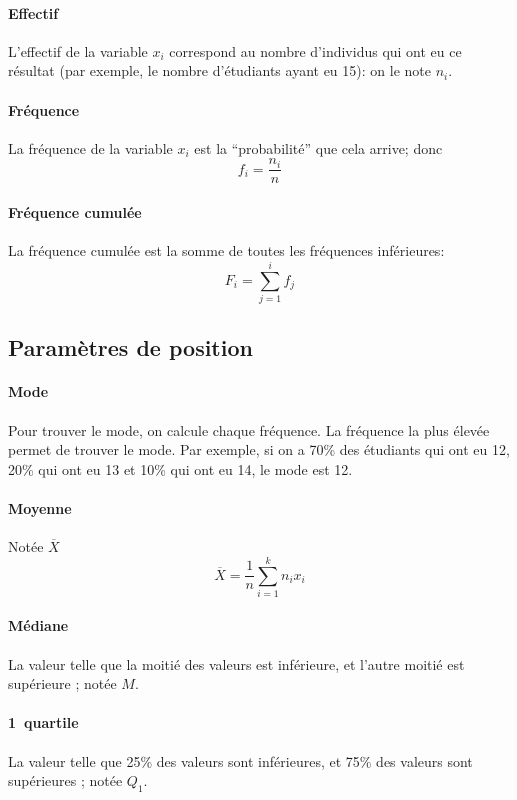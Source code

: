 \documentclass[10pt,a4paper,french]{article}
\begin{document}
\paragraph{Effectif}
L'effectif de la variable $x_i$ correspond au nombre d'individus qui ont eu ce résultat (par exemple, le nombre d'étudiants ayant eu 15): on le note $n_i$.

\paragraph{Fréquence}
La fréquence de la variable $x_i$ est la ``probabilité'' que cela arrive; donc \[ f_i = \frac{n_i}{n} \]

\paragraph{Fréquence cumulée}
La fréquence cumulée est la somme de toutes les fréquences inférieures: \[ F_i = \sum_{j=1}^i f_j \]

\subsection{Paramètres de position}

\paragraph{Mode}
Pour trouver le mode, on calcule chaque fréquence. La fréquence la plus élevée permet de trouver le mode. Par exemple, si on a 70\% des étudiants qui ont eu 12, 20\% qui ont eu 13 et 10\% qui ont eu 14, le mode est 12.

\paragraph{Moyenne}
Notée $\overline{X}$ \[ \overline{X} = \frac{1}{n} \sum_{i=1}^k n_i x_i \]

\paragraph{Médiane}
La valeur telle que la moitié des valeurs est inférieure, et l'autre moitié est supérieure ; notée $M$.

\paragraph{1\ier~quartile}
La valeur telle que 25\% des valeurs sont inférieures, et 75\% des valeurs sont supérieures ; notée $Q_1$.
\end{document}

